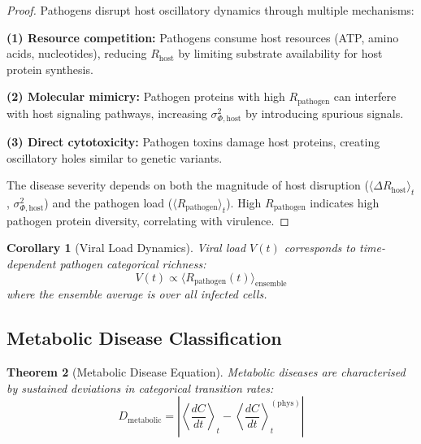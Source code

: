 \documentclass[11pt,twocolumn,a4paper]{article}
\newtheorem{theorem}{Theorem}[section]
\newtheorem{corollary}[theorem]{Corollary}
\theoremstyle{definition}
\theoremstyle{remark}
\begin{document}
\begin{proof}
Pathogens disrupt host oscillatory dynamics through multiple mechanisms:

\textbf{(1) Resource competition:} Pathogens consume host resources (ATP, amino acids, nucleotides), reducing $R_{\mathrm{host}}$ by limiting substrate availability for host protein synthesis.

\textbf{(2) Molecular mimicry:} Pathogen proteins with high $R_{\mathrm{pathogen}}$ can interfere with host signaling pathways, increasing $\sigma_{\Phi,\mathrm{host}}^2$ by introducing spurious signals.

\textbf{(3) Direct cytotoxicity:} Pathogen toxins damage host proteins, creating oscillatory holes similar to genetic variants.

The disease severity depends on both the magnitude of host disruption ($\langle\Delta R_{\mathrm{host}}\rangle_t$, $\sigma_{\Phi,\mathrm{host}}^2$) and the pathogen load ($\langle R_{\mathrm{pathogen}}\rangle_t$). High $R_{\mathrm{pathogen}}$ indicates high pathogen protein diversity, correlating with virulence.
\end{proof}

\begin{corollary}[Viral Load Dynamics]
\label{cor:viral_load}
Viral load $V(t)$ corresponds to time-dependent pathogen categorical richness:
\begin{equation}
V(t) \propto \langle R_{\mathrm{pathogen}}(t) \rangle_{\mathrm{ensemble}}
\label{eq:viral_load}
\end{equation}
where the ensemble average is over all infected cells.
\end{corollary}

\subsection{Metabolic Disease Classification}

\begin{theorem}[Metabolic Disease Equation]
\label{thm:metabolic_disease}
Metabolic diseases are characterised by sustained deviations in categorical transition rates:
\begin{equation}
D_{\mathrm{metabolic}} = \left|\left\langle\frac{dC}{dt}\right\rangle_t - \left\langle\frac{dC}{dt}\right\rangle_t^{\mathrm{(phys)}}\right|
\label{eq:metabolic_disease}
\end{equation}
\end{theorem}
\end{document}
